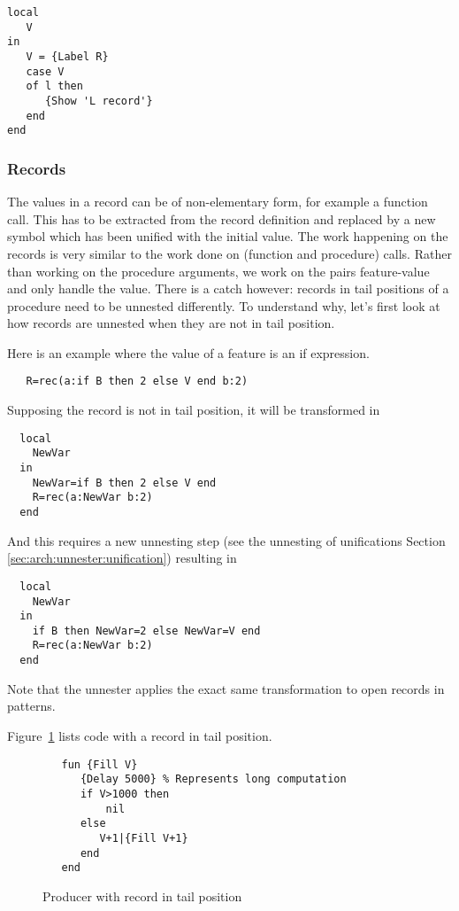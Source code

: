 \documentclass[a4paper]{memoir}
\begin{document}
\begin{lstlisting}
local
   V
in
   V = {Label R}
   case V 
   of l then
      {Show 'L record'}
   end
end
\end{lstlisting}
   

\subsubsection{Records}\label{sec:arch:unnester:records}
The values in a record can be of non-elementary form, for example a function call. This has to be extracted from the record definition and replaced by a new symbol which has been unified with the initial value. The work happening on the records is very similar to the work done on (function and procedure) calls. Rather than working on the procedure arguments, we work on the pairs feature-value and only handle the value. 
There is a catch however: records in tail positions of a procedure need to be unnested
differently. To understand why, let's first look at how records are unnested
when they are not in tail position.

Here is an example where the value of a feature is an if expression.
\begin{lstlisting}
   R=rec(a:if B then 2 else V end b:2)
\end{lstlisting}
Supposing the record is not in tail position, it will be transformed in
\begin{lstlisting}
  local
    NewVar
  in
    NewVar=if B then 2 else V end
    R=rec(a:NewVar b:2)
  end
\end{lstlisting}
And this requires a new unnesting step (see the unnesting of unifications Section \ref{sec:arch:unnester:unification}) resulting in 
\begin{lstlisting}
  local
    NewVar
  in
    if B then NewVar=2 else NewVar=V end
    R=rec(a:NewVar b:2)
  end
\end{lstlisting}

Note that the unnester applies the exact same transformation to open records in
patterns.



Figure~\ref{fig:unnester:fill_tail} lists code with a record in tail position.

\begin{figure}[h]
\begin{lstlisting}
   fun {Fill V}
      {Delay 5000} % Represents long computation
      if V>1000 then
	      nil
      else
         V+1|{Fill V+1}
      end
   end
\end{lstlisting}
\caption{Producer with record in tail position}
\label{fig:unnester:fill_tail}
\end{figure}
\end{document}
